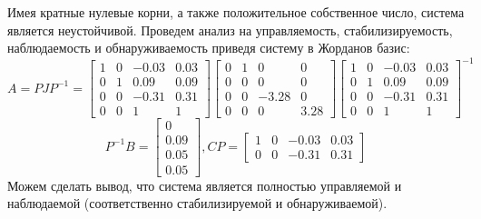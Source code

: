 Имея кратные нулевые корни, а также положительное собственное число, система является неустойчивой. Проведем анализ на управляемость, стабилизируемость, наблюдаемость и обнаруживаемость приведя систему в Жорданов базис:
\begin{equation*}
    A = PJP^{-1} = \begin{bmatrix}
        1 & 0 & -0.03 & 0.03 \\
        0 & 1 & 0.09 & 0.09 \\
        0 & 0 & -0.31 & 0.31 \\
        0 & 0 & 1 & 1
    \end{bmatrix}
    \begin{bmatrix}
        0 & 1 & 0 & 0 \\
        0 & 0 & 0 & 0 \\
        0 & 0 & -3.28 & 0 \\
        0 & 0 & 0 & 3.28
    \end{bmatrix}
    \begin{bmatrix}
        1 & 0 & -0.03 & 0.03 \\
        0 & 1 & 0.09 & 0.09 \\
        0 & 0 & -0.31 & 0.31 \\
        0 & 0 & 1 & 1
    \end{bmatrix}^{-1}
\end{equation*}
\begin{equation*}
    P^{-1}B = \begin{bmatrix}
        0 \\ 0.09 \\ 0.05 \\ 0.05
    \end{bmatrix},
    CP = \begin{bmatrix}
        1 & 0 & -0.03 & 0.03 \\
        0 & 0 & -0.31 & 0.31
    \end{bmatrix}
\end{equation*}
Можем сделать вывод, что система является полностью управляемой и наблюдаемой (соответственно стабилизируемой и обнаруживаемой).


